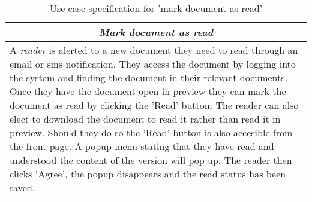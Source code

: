 \begin{table}
\centering
\begin{tabular}{p{12cm}}
\hline
\multicolumn{1}{c}{\textit{\textbf{Mark document as read}}} \\
\hline
A \textit{reader} is alerted to a new document they need to read through an email or sms notification.
They access the document by logging into the system and finding the document in their relevant documents.
Once they have the document open in preview they can mark the document as read by clicking the 'Read' button.
The reader can also elect to download the document to read it rather than read it in preview.
Should they do so the 'Read' button is also accesible from the front page.
A popup menu stating that they have read and understood the content of the version will pop up.
The reader then clicks 'Agree', the popup disappears and the read status has been saved.
\\\hline
\end{tabular}
\caption{Use case specification for 'mark document as read'}\label{tab:mark-read}
\end{table}